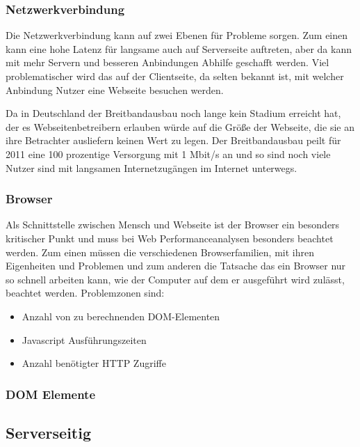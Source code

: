 \subsubsection{Netzwerkverbindung}
Die Netzwerkverbindung kann auf zwei Ebenen für Probleme sorgen. Zum einen kann eine hohe Latenz für langsame auch auf Serverseite auftreten, aber da kann mit mehr Servern und besseren Anbindungen Abhilfe geschafft werden. Viel problematischer wird das auf der Clientseite, da selten bekannt ist, mit welcher Anbindung Nutzer eine Webseite besuchen werden.%

Da in Deutschland der Breitbandausbau noch lange kein Stadium erreicht hat, der es Webseitenbetreibern erlauben würde auf die Größe der Webseite, die sie an ihre Betrachter ausliefern keinen Wert zu legen. Der Breitbandausbau peilt für 2011 eine 100 prozentige Versorgung mit 1 Mbit/s an und so sind noch viele Nutzer sind mit langsamen Internetzugängen im Internet unterwegs. %

\subsubsection{Browser}
Als Schnittstelle zwischen Mensch und Webseite ist der Browser ein besonders kritischer Punkt und muss bei Web Performanceanalysen besonders beachtet werden. Zum einen müssen die verschiedenen Browserfamilien, mit ihren Eigenheiten und Problemen und zum anderen die Tatsache das ein Browser nur so schnell arbeiten kann, wie der Computer auf dem er ausgeführt wird zulässt, beachtet werden. 
Problemzonen sind:
\begin{itemize}
  \item Anzahl von zu berechnenden DOM-Elementen %
  \item Javascript Ausführungszeiten
  \item Anzahl benötigter HTTP Zugriffe %
\end{itemize}

\subsubsection{DOM Elemente}
\subsection{Serverseitig}


